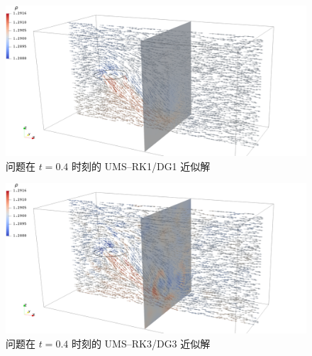 \begin{figure}[h!]
\begin{centering}
\includegraphics[width=1\textwidth,height=0.26\textheight,keepaspectratio]{figures/forward/p=1/Frame40}
\par\end{centering}
\caption{\label{fig:forward_t=00003D4e-1_p=00003D1}问题在
$t=0.4$ 时刻的 UMS–RK1/DG1 近似解}
\end{figure}

\begin{figure}[h!]
\begin{centering}
\includegraphics[width=1\textwidth,height=0.26\textheight,keepaspectratio]{figures/forward/p=3/Frame40}
\par\end{centering}
\caption{\label{fig:forward_t=00003D4e-1_p=00003D3}问题在
$t=0.4$ 时刻的 UMS–RK3/DG3 近似解}
\end{figure}

